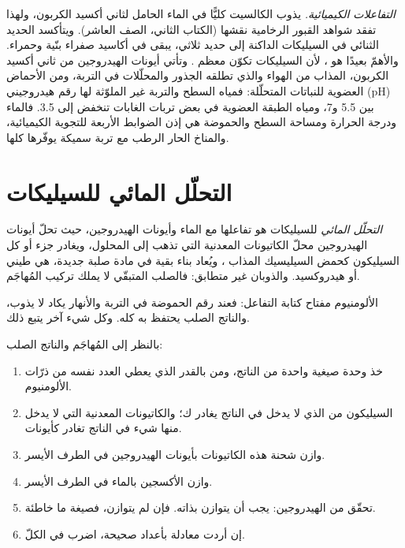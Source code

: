 \emph{التفاعلات الكيميائية.} يذوب الكالسيت كليًّا في الماء الحامل لثاني أكسيد الكربون، ولهذا تفقد شواهد القبور الرخامية نقشها (الكتاب الثاني، الصف العاشر). ويتأكسد الحديد الثنائي في السيليكات الداكنة إلى حديد ثلاثي، يبقى في أكاسيد صفراء بنّية وحمراء. والأهمّ بعيدًا هو ، لأن السيليكات تكوّن معظم . وتأتي أيونات الهيدروجين من ثاني أكسيد الكربون، المذاب من الهواء والذي تطلقه الجذور والمحلّلات في التربة، ومن الأحماض العضوية للنباتات المتحلّلة: فمياه السطح والتربة غير الملوّثة لها رقم هيدروجيني (pH) بين 5.5 و\num{7}، ومياه الطبقة العضوية في بعض تربات الغابات تنخفض إلى 3.5. فالماء ودرجة الحرارة ومساحة السطح والحموضة هي إذن الضوابط الأربعة للتجوية الكيميائية، والمناخ الحار الرطب مع تربة سميكة يوفّرها كلها.

\section{التحلّل المائي للسيليكات}\label{sec:b1:weathering-clays:hydrolysis}

\begin{definition}\label{def:b1:weathering-clays:hydrolysis}
\emph{التحلّل المائي} للسيليكات هو تفاعلها مع الماء وأيونات الهيدروجين، حيث تحلّ أيونات الهيدروجين محلّ الكاتيونات المعدنية التي تذهب إلى المحلول، ويغادر جزء أو كل السيليكون كحمض السيليسيك المذاب ، ويُعاد بناء بقية  في مادة صلبة جديدة، هي  طيني أو هيدروكسيد. والذوبان غير متطابق: فالصلب المتبقّي لا يملك تركيب  المُهاجَم.
\end{definition}

الألومنيوم مفتاح كتابة التفاعل: فعند رقم الحموضة في التربة والأنهار يكاد لا يذوب، والناتج الصلب يحتفظ به كله. وكل شيء آخر يتبع ذلك.

\begin{method}\label{met:b1:weathering-clays:balance}
بالنظر إلى  المُهاجَم والناتج الصلب:
\begin{enumerate}
  \item خذ وحدة صيغية واحدة من الناتج، ومن  بالقدر الذي يعطي العدد نفسه من ذرّات الألومنيوم.
  \item السيليكون من  الذي لا يدخل في الناتج يغادر ك؛ والكاتيونات المعدنية التي لا يدخل منها شيء في الناتج تغادر كأيونات.
  \item وازن شحنة هذه الكاتيونات بأيونات الهيدروجين في الطرف الأيسر.
  \item وازن الأكسجين بالماء في الطرف الأيسر.
  \item تحقّق من الهيدروجين: يجب أن يتوازن بذاته. فإن لم يتوازن، فصيغة ما خاطئة.
  \item إن أردت معادلة بأعداد صحيحة، اضرب في الكلّ.
\end{enumerate}
\end{method}

